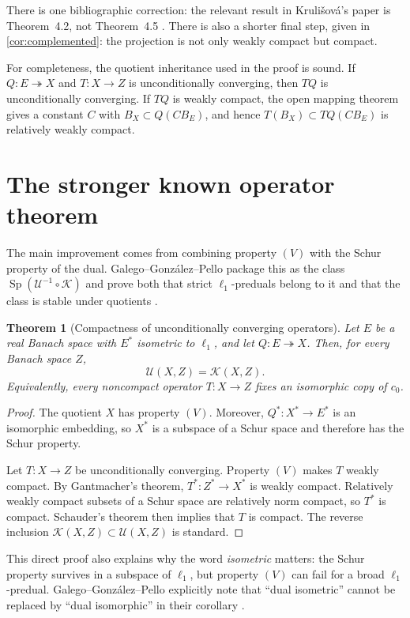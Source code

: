 \documentclass[11pt]{article}
\newtheorem{theorem}{Theorem}[section]
\theoremstyle{definition}
\newcommand{\cU}{\mathcal U}
\newcommand{\cK}{\mathcal K}
\newcommand{\onto}{\twoheadrightarrow}
\newcommand{\SpUK}{\operatorname{Sp}(\cU^{-1}\circ\cK)}
\begin{document}
There is one bibliographic correction: the relevant result in
Kruli\v{s}ov\'a's paper is Theorem~4.2, not Theorem~4.5
\cite[Theorem~4.2]{Krulisova2015}.  There is also a shorter final step, given
in \cref{cor:complemented}: the projection is not only weakly compact but
compact.

For completeness, the quotient inheritance used in the proof is sound.  If
$Q:E\onto X$ and $T:X\to Z$ is unconditionally converging, then $TQ$ is
unconditionally converging.  If $TQ$ is weakly compact, the open mapping
theorem gives a constant $C$ with $B_X\subset Q(CB_E)$, and hence
$T(B_X)\subset TQ(CB_E)$ is relatively weakly compact.

\section{The stronger known operator theorem}

The main improvement comes from combining property $(V)$ with the Schur
property of the dual.  Galego--Gonz\'alez--Pello package this as the class
$\SpUK$ and prove both that strict $\ell_1$-preduals belong to it and that the
class is stable under quotients \cite[Corollary~3.5 and
Proposition~3.6]{GalegoGonzalezPello2017}.

\begin{theorem}[Compactness of unconditionally converging operators]
\label{thm:UK}
Let $E$ be a real Banach space with $E^*$ isometric to $\ell_1$, and let
$Q:E\onto X$.  Then, for every Banach space $Z$,
\[
   \cU(X,Z)=\cK(X,Z).
\]
Equivalently, every noncompact operator $T:X\to Z$ fixes an isomorphic copy of
$c_0$.
\end{theorem}

\begin{proof}
The quotient $X$ has property $(V)$.  Moreover, $Q^*:X^*\to E^*$ is an
isomorphic embedding, so $X^*$ is a subspace of a Schur space and therefore
has the Schur property.

Let $T:X\to Z$ be unconditionally converging.  Property $(V)$ makes $T$
weakly compact.  By Gantmacher's theorem, $T^*:Z^*\to X^*$ is weakly
compact.  Relatively weakly compact subsets of a Schur space are relatively
norm compact, so $T^*$ is compact.  Schauder's theorem then implies that $T$
is compact.  The reverse inclusion $\cK(X,Z)\subset\cU(X,Z)$ is standard.
\end{proof}

This direct proof also explains why the word \emph{isometric} matters: the
Schur property survives in a subspace of $\ell_1$, but property $(V)$ can fail
for a broad $\ell_1$-predual.  Galego--Gonz\'alez--Pello explicitly note that
``dual isometric'' cannot be replaced by ``dual isomorphic'' in their
corollary \cite[Corollary~3.5]{GalegoGonzalezPello2017}.
\end{document}
